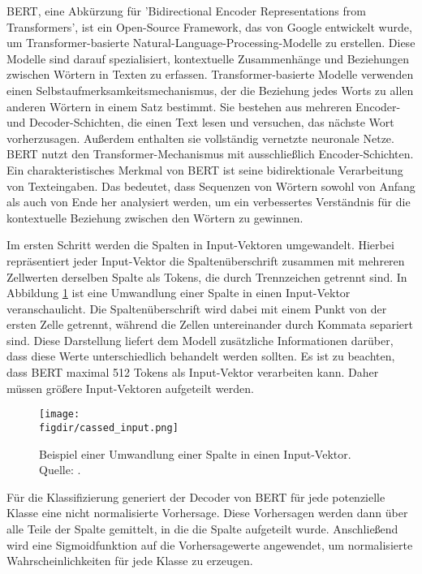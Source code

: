 BERT, eine Abkürzung für 'Bidirectional Encoder Representations from Transformers', ist ein Open-Source Framework, das von Google entwickelt wurde, um Transformer-basierte Natural-Language-Processing-Modelle zu erstellen. Diese Modelle sind darauf spezialisiert, kontextuelle Zusammenhänge und Beziehungen zwischen Wörtern in Texten zu erfassen. Transformer-basierte Modelle verwenden einen Selbstaufmerksamkeitsmechanismus, der die Beziehung jedes Worts zu allen anderen Wörtern in einem Satz bestimmt. Sie bestehen aus mehreren Encoder- und Decoder-Schichten, die einen Text lesen und versuchen, das nächste Wort vorherzusagen. Außerdem enthalten sie vollständig vernetzte neuronale Netze. BERT nutzt den Transformer-Mechanismus mit ausschließlich Encoder-Schichten. Ein charakteristisches Merkmal von BERT ist seine bidirektionale Verarbeitung von Texteingaben. Das bedeutet, dass Sequenzen von Wörtern sowohl von Anfang als auch von Ende her analysiert werden, um ein verbessertes Verständnis für die kontextuelle Beziehung zwischen den Wörtern zu gewinnen.

Im ersten Schritt werden die Spalten in Input-Vektoren umgewandelt. Hierbei repräsentiert jeder Input-Vektor die Spaltenüberschrift zusammen mit mehreren Zellwerten derselben Spalte als Tokens, die durch Trennzeichen getrennt sind. In Abbildung \ref{f:input} ist eine Umwandlung einer Spalte in einen Input-Vektor veranschaulicht.  Die Spaltenüberschrift wird dabei mit einem Punkt von der ersten Zelle getrennt, während die Zellen untereinander durch Kommata separiert sind. Diese Darstellung liefert dem Modell zusätzliche Informationen darüber, dass diese Werte unterschiedlich behandelt werden sollten. Es ist zu beachten, dass BERT maximal 512 Tokens als Input-Vektor verarbeiten kann. Daher müssen größere Input-Vektoren aufgeteilt werden.

\begin{figure}[htbp]
    \centering
    \texttt{[image: \\figdir/cassed\_input.png]}
    \caption{Beispiel einer Umwandlung einer Spalte in einen Input-Vektor. Quelle: \cite{Kuzina.2023}.}
    \label{f:input}
\end{figure}

Für die Klassifizierung generiert der Decoder von BERT für jede potenzielle Klasse eine nicht normalisierte Vorhersage. Diese Vorhersagen werden dann über alle Teile der Spalte gemittelt, in die die Spalte aufgeteilt wurde. Anschließend wird eine Sigmoidfunktion auf die Vorhersagewerte angewendet, um normalisierte Wahrscheinlichkeiten für jede Klasse zu erzeugen.


